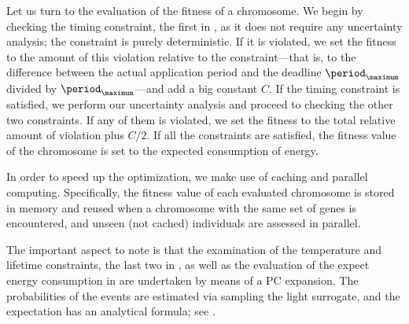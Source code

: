 Let us turn to the evaluation of the fitness of a chromosome. We begin by
checking the timing constraint, the first in
, as it does not require any uncertainty
analysis; the constraint is purely deterministic. If it is violated, we set the
fitness to the amount of this violation relative to the constraint---that is, to
the difference between the actual application period and the deadline
$\period_\maximum$ divided by $\period_\maximum$---and add a big constant $C$.
If the timing constraint is satisfied, we perform our uncertainty analysis and
proceed to checking the other two constraints. If any of them is violated, we
set the fitness to the total relative amount of violation plus $C / 2$. If all
the constraints are satisfied, the fitness value of the chromosome is set to the
expected consumption of energy.

In order to speed up the optimization, we make use of caching and parallel
computing. Specifically, the fitness value of each evaluated chromosome is
stored in memory and reused when a chromosome with the same set of genes is
encountered, and unseen (not cached) individuals are assessed in parallel.

The important aspect to note is that the examination of the temperature and
lifetime constraints, the last two in , as
well as the evaluation of the expect energy consumption in
 are undertaken by means of a \ac{PC}
expansion. The probabilities of the events are estimated via sampling the light
surrogate, and the expectation has an analytical formula; see
.
